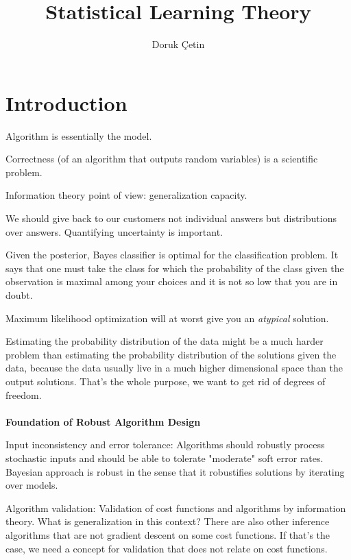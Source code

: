 \documentclass[12pt]{article}
\begin{document}
\rhead{\today}

\title{Statistical Learning Theory}
\author{Doruk Çetin}
\maketitle

\tableofcontents
\pagebreak

\section{Introduction}
\ulb
\item Algorithm is essentially the model.
\item Correctness (of an algorithm that outputs random variables) is a scientific problem.
\item Information theory point of view: generalization capacity.
\item We should give back to our customers not individual answers but distributions over answers. Quantifying uncertainty is important.
\item Given the posterior, Bayes classifier is optimal for the classification problem. It says that one must take the class for which the probability of the class given the observation is maximal among your choices and it is not so low that you are in doubt.
\item Maximum likelihood optimization will at worst give you an \textit{atypical} solution.
\ule
\par Estimating the probability distribution of the data might be a much harder  problem than estimating the probability distribution of the solutions given the data, because the data usually live in a much higher dimensional space than the output solutions. That's the whole purpose, we want to get rid of degrees of freedom.
\\\\
\textbf{Foundation of Robust Algorithm Design}
\ulb
\item Input inconsistency and error tolerance: Algorithms should robustly process stochastic inputs and should be able to tolerate "moderate" soft error rates. Bayesian approach is robust in the sense that it robustifies solutions by iterating over models.
\item Algorithm validation: Validation of cost functions and algorithms by information theory. What is generalization in this context? There are also other inference algorithms that are not gradient descent on some cost functions. If that's the case, we need a concept for validation that does not relate on cost functions.
\end{document}
